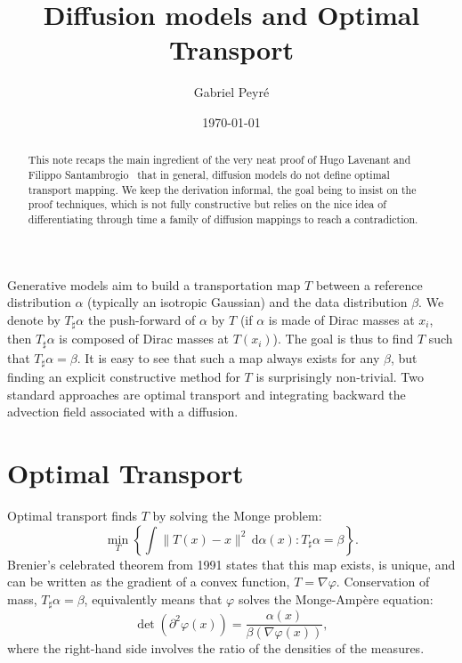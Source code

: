 \documentclass{article}
\title{Diffusion models and Optimal Transport}
\author{Gabriel Peyr\'e}
\date{\today}
\begin{document}
\maketitle

\begin{abstract}
	This note recaps the main ingredient of the very neat proof of Hugo Lavenant and Filippo Santambrogio~\cite{LavenantSantambrogio20} that in general, diffusion models do not define optimal transport mapping. We keep the derivation informal, the goal being to insist on the proof techniques, which is not fully constructive but relies on the nice idea of differentiating through time a family of diffusion mappings to reach a contradiction.
\end{abstract}

Generative models aim to build a transportation map $T$ between a reference distribution $\alpha$ (typically an isotropic Gaussian) and the data distribution $\beta$.
%
We denote by $T_\sharp \alpha$ the push-forward of $\alpha$ by $T$ (if $\alpha$ is made of Dirac masses at $x_i$, then $T_\sharp \alpha$ is composed of Dirac masses at $T(x_i)$). The goal is thus to find $T$ such that $T_\sharp \alpha = \beta$.
%
It is easy to see that such a map always exists for any $\beta$, but finding an explicit constructive method for $T$ is surprisingly non-trivial. Two standard approaches are optimal transport and integrating backward the advection field associated with a diffusion.

\section{Optimal Transport}

Optimal transport finds $T$ by solving the Monge problem:
\begin{equation}\label{eq:monge}
    \min_T \left\{ \int \|T(x) - x\|^2 \, \mathrm{d}\alpha(x) : T_\sharp \alpha = \beta \right\}. 
\end{equation}
Brenier's celebrated theorem from 1991 states that this map exists, is unique, and can be written as the gradient of a convex function, $T = \nabla \varphi$. Conservation of mass, $T_\sharp \alpha = \beta$, equivalently means that $\varphi$ solves the Monge-Ampère equation:
\begin{equation}\label{eq:monge-ampere}
    \det(\partial^2 \varphi(x)) = \frac{\alpha(x)}{\beta(\nabla \varphi(x))}, 
\end{equation}
where the right-hand side involves the ratio of the densities of the measures. 
\end{document}
